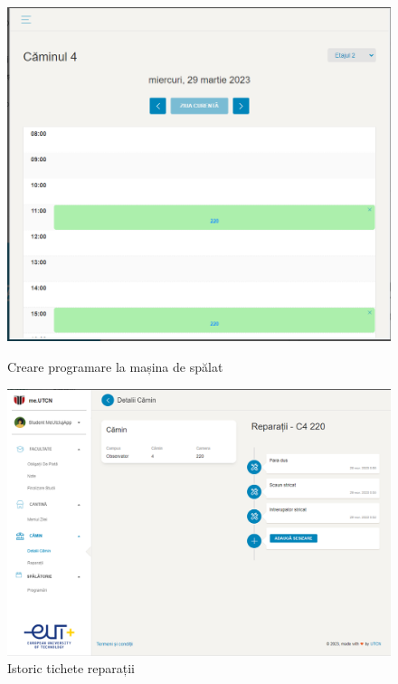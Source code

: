 \documentclass[12pt,a4paper]{report}
\theoremstyle{definition}
\theoremstyle{remark}
\begin{document}
\begin{figure}[H]
    \centering
    \begin{minipage}{.5\textwidth}
        \centering
        \includegraphics[width=.9\linewidth]{resurse/aplicatii_similare/me.utcj.png}
        \caption{Creare programare la mașina de spălat}

    \end{minipage}%
    \begin{minipage}{.5\textwidth}
        \centering
        \includegraphics[width=.9\linewidth]{resurse/aplicatii_similare/me.utcj_tichete.png}
        \caption{Istoric tichete reparații}

    \end{minipage}
\end{figure}
\end{document}
